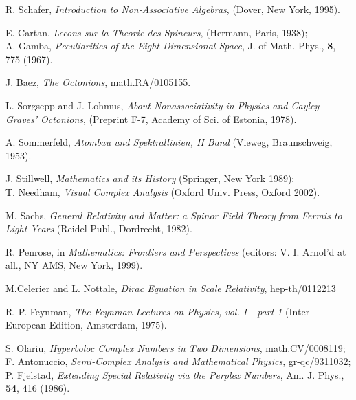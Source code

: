 \documentclass[a4paper,12pt]{article}
\begin{document}
\begin{thebibliography}{99}

 R. Schafer,
            {\it Introduction to Non-Associative Algebras},
            (Dover, New York, 1995).

 E. Cartan,
             {\it Lecons sur la Theorie des Spineurs},
             (Hermann, Paris, 1938); \\
              A. Gamba,
             {\it Peculiarities of the Eight-Dimensional Space},
             J. of Math. Phys., {\bf 8}, 775 (1967).

 J. Baez,
             {\it The Octonions},
             math.RA/0105155.

 L. Sorgsepp and J. Lohmus,
               {\it About Nonassociativity in Physics and Cayley-Graves' 
                Octonions},
               (Preprint F-7, Academy of Sci. of Estonia, 1978).

 A. Sommerfeld,
            {\it Atombau und Spektrallinien, II Band} 
            (Vieweg, Braunschweig, 1953).

 J. Stillwell,
             {\it Mathematics and its History}
             (Springer, New York 1989); \\
             T. Needham,
             {\it Visual Complex Analysis}
             (Oxford Univ. Press, Oxford 2002). 

 M. Sachs,
            {\it General Relativity and Matter: a Spinor Field Theory from 
            Fermis to Light-Years} (Reidel Publ., Dordrecht, 1982).

 R. Penrose,
            in {\it Mathematics: Frontiers and Perspectives}
            (editors: V. I. Arnol'd at all., NY AMS, New York, 1999).

 M.Celerier and L. Nottale,
              {\it Dirac Equation in Scale Relativity},
              hep-th/0112213 

 R. P. Feynman,
            {\it The Feynman Lectures on Physics, vol. I - part 1} 
            (Inter European Edition, Amsterdam, 1975).

 S. Olariu,
             {\it Hyperboloc Complex Numbers in Two Dimensions},
             math.CV/0008119; \\
          F. Antonuccio,
             {\it Semi-Complex Analysis and Mathematical Physics}, 
             gr-qc/9311032; \\
             P. Fjelstad,
             {\it Extending Special Relativity via the Perplex Numbers},
             Am. J. Phys., {\bf 54}, 416 (1986).


\end{thebibliography}
\end{document}
